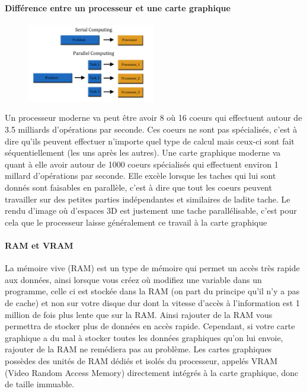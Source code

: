 \documentclass[a4paper,10pt]{report}
\begin{document}
\paragraph{Différence entre un processeur et une carte graphique}
\begin{figure}
    \centering
    \includegraphics[width=0.5\textwidth]{parallel_computing_vs_sequential_computing}
\end{figure}
Un processeur moderne va peut être avoir 8 où 16 coeurs qui effectuent autour de 3.5 milliards d'opérations par seconde. Ces coeurs ne sont pas spécialisés, c'est à dire qu'ils peuvent effectuer n'importe quel type de calcul mais ceux-ci sont fait séquentiellement (les uns après les autres).
Une carte graphique moderne va quant à elle avoir autour de 1000 coeurs spécialisés qui effectuent environ 1 millard d'opérations par seconde. Elle excèle lorsque les taches qui lui sont donnés sont faisables en parallèle, c'est à dire que tout les coeurs peuvent travailler sur des petites parties indépendantes et similaires de ladite tache. Le rendu d'image où d'espaces 3D est justement une tache parallélisable, c'est pour cela que le processeur laisse généralement ce travail à la carte graphique

\paragraph{RAM et VRAM}
La mémoire vive (RAM) est un type de mémoire qui permet un accès très rapide aux données, ainsi lorsque vous créez où modifiez une variable dans un programme, celle ci est stockée dans la RAM (on part du principe qu'il n'y a pas de cache) et non sur votre disque dur dont la vitesse d'accès à l'information est 1 million de fois plus lente que sur la RAM. Ainsi rajouter de la RAM vous permettra de stocker plus de données en accès rapide. Cependant, si votre carte graphique a du mal à stocker toutes les données graphiques qu'on lui envoie, rajouter de la RAM ne remédiera pas au problème. Les cartes graphiques possèdes des unités de RAM dédiés et isolés du processeur, appelés VRAM (Video Random Access Memory) directement intégrés à la carte graphique, donc de taille immuable.
\end{document}
